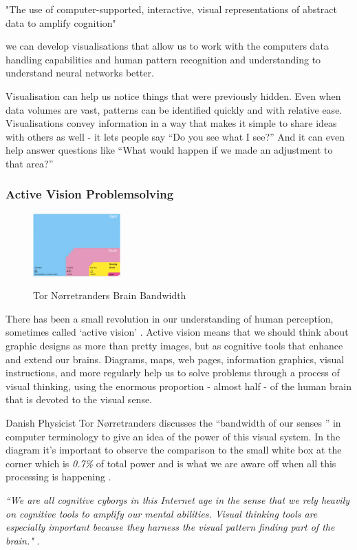\documentclass[a4paper,11pt,titlepage]{article}
\begin{document}
"The use of computer-supported, interactive, visual representations of abstract data to amplify cognition" \cite{card1999}

we can develop visualisations that allow us to work with the computers data handling capabilities and human pattern recognition and understanding to understand neural networks better. 

Visualisation can help us notice things that were previously hidden. Even when data volumes are vast, patterns can be identified quickly and with relative ease. Visualisations convey information in a way that makes it simple to share ideas with others as well -  it lets people say “Do you see what I see?” And it can even help answer questions like “What would happen if we made an adjustment to that area?”


\subsubsection{Active Vision Problemsolving}
		
		\begin{figure}[H]
    			\centering	
			{{\includegraphics[width=0.3\textwidth]
    				{img/brain_bandwidth.png} 
    			}}%
    			\caption{Tor Nørretranders Brain Bandwidth}%
    		\label{fig:TufteExcellence}
		\end{figure}

 		There has been a small revolution in our understanding of human perception, sometimes called `active vision' \cite{Ware2010}. Active vision means that we should think about graphic designs as more than pretty images, but as cognitive tools that enhance and extend our brains. Diagrams, maps, web pages, information graphics, visual instructions, and more regularly help us to solve problems through a process of visual thinking, using the enormous proportion - almost half - of the human brain that is devoted to the visual sense.  
	
		\par 
		Danish Physicist Tor Nørretranders discusses the ``bandwidth of our senses ” in computer terminology to give an idea of the power of this visual system. In the diagram it's important to observe the comparison to the small white box at the corner which is \textit{0.7\%} of total power and is what we are aware off when all this processing is happening \cite{Tufte2012}.		
		\par 
		\textit{``We are all cognitive cyborgs in this Internet age in the sense that we rely heavily on cognitive tools to amplify our mental abilities. Visual thinking tools are especially important because they harness the visual pattern finding part of the brain."} \cite{Ware2010}.
\\\
\end{document}
